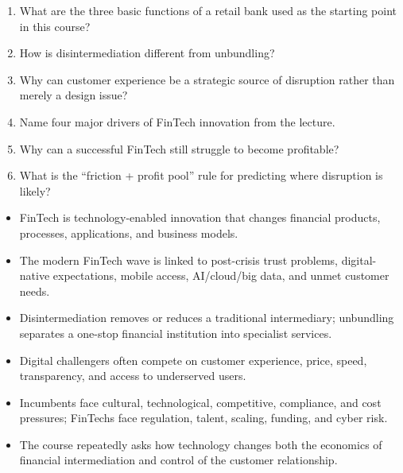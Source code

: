 \begin{quickcheck}
\begin{enumerate}
  \item What are the three basic functions of a retail bank used as the starting point in this course?
  \item How is disintermediation different from unbundling?
  \item Why can customer experience be a strategic source of disruption rather than merely a design issue?
  \item Name four major drivers of FinTech innovation from the lecture.
  \item Why can a successful FinTech still struggle to become profitable?
  \item What is the ``friction + profit pool'' rule for predicting where disruption is likely?
\end{enumerate}
\end{quickcheck}

\begin{chapterrecap}
\begin{itemize}
  \item FinTech is technology-enabled innovation that changes financial products, processes, applications, and business models.
  \item The modern FinTech wave is linked to post-crisis trust problems, digital-native expectations, mobile access, AI/cloud/big data, and unmet customer needs.
  \item Disintermediation removes or reduces a traditional intermediary; unbundling separates a one-stop financial institution into specialist services.
  \item Digital challengers often compete on customer experience, price, speed, transparency, and access to underserved users.
  \item Incumbents face cultural, technological, competitive, compliance, and cost pressures; FinTechs face regulation, talent, scaling, funding, and cyber risk.
  \item The course repeatedly asks how technology changes both the economics of financial intermediation and control of the customer relationship.
\end{itemize}
\end{chapterrecap}
